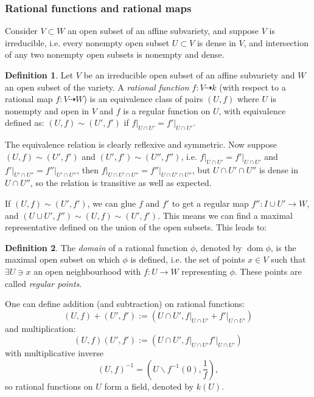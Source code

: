\documentclass{article}
\newcommand{\dom}{\operatorname{dom}}
\theoremstyle{definition}
\newtheorem{defn}{Definition}[subsection]
\begin{document}
\subsubsection{Rational functions and rational maps}
Consider $V\subset W$ an open subset of an affine subvariety, and suppose $V$ is irreducible, i.e. every nonempty open subset $U\subset V$ is dense in $V$, and intersection of any two nonempty open subsets is nonempty and dense.

\begin{defn}
Let $V$ be an irreducible open subset of an affine subvariety and $W$ an open subset of the variety. A \textit{rational function} $f:V\dashrightarrow k$ (with respect to a rational map $f:V\dashrightarrow W$) is an equivalence class of pairs $(U,f)$ where $U$ is nonempty and open in $V$ and $f$ is a regular function on $U$, with equivalence defined as: $(U,f)\sim (U',f')$ if $\left. f\right|_{U\cap U'}=\left. f'\right|_{U\cap U'}$.
\end{defn}

The equivalence relation is clearly reflexive and symmetric. Now suppose $(U,f)\sim (U',f')$ and $(U',f')\sim (U'',f'')$, i.e. $\left. f\right|_{U\cap U'}=\left. f'\right|_{U\cap U'}$ and $\left. f'\right|_{U'\cap U''}=\left. f''\right|_{U'\cap U''}$, then $\left. f\right|_{U\cap U'\cap U''}=\left. f''\right|_{U\cap U'\cap U''}$, but $U\cap U'\cap U''$ is dense in $U\cap U''$, so the relation is transitive as well as expected.

If $(U,f)\sim (U',f')$, we can glue $f$ and $f'$ to get a regular map $f'':I\cup U'\rightarrow W$, and $(U\cup U',f'')\sim (U,f)\sim (U',f')$. This means we can find a maximal representative defined on the union of the open subsets. This leads to:

\begin{defn}
The \textit{domain} of a rational function $\phi$, denoted by $\dom\phi$, is the maximal open subset on which $\phi$ is defined, i.e. the set of points $x\in V$ such that $\exists U\ni x$ an open neighbourhood with $f:U\rightarrow W$ representing $\phi$. These points are called \textit{regular points}.
\end{defn}

One can define addition (and subtraction) on rational functions:
\[
(U,f)+(U',f'):=\left(U\cap U',\left. f\right|_{U\cap U'}+\left. f'\right|_{U\cap U'}\right)
\]
and multiplication:
\[
(U,f)(U',f'):=\left(U\cap U',\left. f\right|_{U\cap U'}\left. f'\right|_{U\cap U'}\right)
\]
with multiplicative inverse
\[
(U,f)^{-1}=\left(U\backslash f^{-1}(0),\frac1f\right),
\]
so rational functions on $U$ form a field, denoted by $k(U)$.
\end{document}

